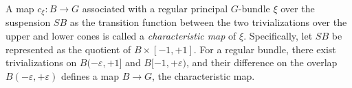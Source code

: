 A map $c_\xi: B \to G$ associated with a regular principal $G$-bundle $\xi$ over the suspension $SB$ as the transition function between the two trivializations over the upper and lower cones is called a \emph{characteristic map} of $\xi$. Specifically, let $SB$ be represented as the quotient of $B \times [-1, +1]$. For a regular bundle, there exist trivializations on $B(-\varepsilon, +1]$ and $B[-1, +\varepsilon)$, and their difference on the overlap $B(-\varepsilon, +\varepsilon)$ defines a map $B \to G$, the characteristic map.
